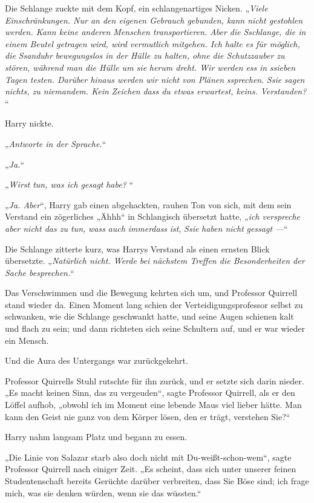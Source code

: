 {Die Schlange zuckte mit dem Kopf, ein schlangenartiges Nicken. „\emph{Viele Einschränkungen. Nur an den eigenen Gebrauch gebunden, kann nicht gestohlen werden. Kann keine anderen Menschen transportieren. Aber die} \emph{Sschlange, die in einem Beutel getragen wird, wird vermutlich mitgehen. Ich halte es für möglich, die} \emph{Ssanduhr} \emph{bewegungslos in der Hülle zu halten, ohne die Schutzzauber zu stören, während man die Hülle um sie} \emph{herum dreht. Wir werden} \emph{ess} \emph{in} \emph{ssieben} \emph{Tagen testen. Darüber hinaus werden wir nicht von Plänen} \emph{ssprechen}. \emph{Ssie} \emph{sagen nichts, zu niemandem. Kein} \emph{Zeichen} \emph{dass du etwas erwartest, keins. Verstanden?} “

Harry nickte.

„\emph{Antworte in der Sprache.}“

„\emph{Ja.}“

„\emph{Wirst tun, was ich gesagt} \emph{habe?} “

„\emph{Ja. Aber}“, Harry gab einen abgehackten, rauhen Ton von sich, mit dem sein Verstand ein zögerliches „Ähhh“ in Schlangisch übersetzt hatte, „\emph{ich verspreche aber nicht das zu tun,} \emph{wass} \emph{auch} \emph{immerdass} \emph{ist}, \emph{Ssie} \emph{haben nicht} \emph{gessagt} \emph{—}“

Die Schlange zitterte kurz, was Harrys Verstand als einen ernsten Blick übersetzte. „\emph{Natürlich nicht. Werde bei nächstem Treffen die Besonderheiten der Sache besprechen.}“

Das Verschwimmen und die Bewegung kehrten sich um, und Professor Quirrell stand wieder da. Einen Moment lang schien der Verteidigungsprofessor selbst zu schwanken, wie die Schlange geschwankt hatte, und seine Augen schienen kalt und flach zu sein; und dann richteten sich seine Schultern auf, und er war wieder ein Mensch.

Und die Aura des Untergangs war zurückgekehrt.

Professor Quirrells Stuhl rutschte für ihn zurück, und er setzte sich darin nieder. „Es macht keinen Sinn, das zu vergeuden“, sagte Professor Quirrell, als er den Löffel aufhob, „obwohl ich im Moment eine lebende Maus viel lieber hätte. Man kann den Geist nie ganz von dem Körper lösen, den er trägt, verstehen Sie?“

Harry nahm langsam Platz und begann zu essen.

„Die Linie von Salazar starb also doch nicht mit Du-weißt-schon-wem“, sagte Professor Quirrell nach einiger Zeit. „Es scheint, dass sich unter unserer feinen Studentenschaft bereits Gerüchte darüber verbreiten, dass Sie Böse sind; ich frage mich, was sie denken würden, wenn sie das wüssten.“

}

